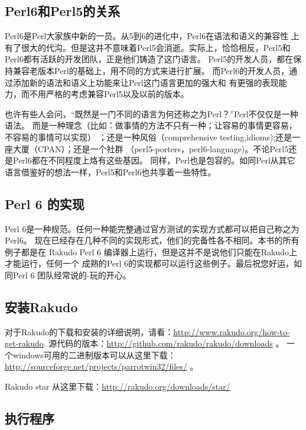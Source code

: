 \documentclass{ctexart}
\begin{document}
\subsection{Perl6和Perl5的关系}
\label{sec-2-3}

Perl6是Perl大家族中新的一员。从5到6的进化中，Perl6在语法和语义的兼容性
上有了很大的代沟。但是这并不意味着Perl5会消逝。实际上，恰恰相反，Perl5和
Perl6都有活跃的开发团队，正是他们铸造了这门语言。
Perl5的开发人员，都在保持兼容老版本Perl的基础上，用不同的方式来进行扩展。
而Perl6的开发人员，通过添加新的语法和语义上功能来让Perl这门语言更加的强大和
有更强的表现能力，而不用严格的考虑兼容Perl5以及以前的版本。

也许有些人会问，“既然是一门不同的语言为何还称之为Perl？”Perl不仅仅是一种语法。
而是一种理念（比如：做事情的方法不只有一种；让容易的事情更容易，不容易的事情可以实现）
；还是一种风俗（comprehensive testing,idioms);还是一座大厦（CPAN）；还是一个社群
（perl5-porters，perl6-language)。不论Perl5还是Perl6都在不同程度上烙有这些基因。
同样，Perl也是包容的。如同Perl从其它语言借鉴好的想法一样，Perl5和Perl6也共享着一些特性。
\subsection{Perl 6 的实现}
\label{sec-2-4}

Perl 6是一种规范。任何一种能完整通过官方测试的实现方式都可以把自己称之为Perl6。
现在已经存在几种不同的实现形式，他们的完备性各不相同。本书的所有例子都是在
Rakudo Perl 6 编译器上运行，但是这并不是说他们只能在Rakudo上才能运行，任何一个
成熟的Perl 6的实现都可以运行这些例子。最后祝您好运，如同Perl 6 团队经常说的-玩的开心。
\subsection{安装Rakudo}
\label{sec-2-5}

对于Rakudo的下载和安装的详细说明，请看：\href{http://www.rakudo.org/how-to-get-rakudo}{http://www.rakudo.org/how-to-get-rakudo}.
源代码的版本：\href{http://github.com/rakudo/rakudo/downloads}{http://github.com/rakudo/rakudo/downloads} 。
一个windows可用的二进制版本可以从这里下载：\href{http://sourceforge.net/projects/parrotwin32/files/}{http://sourceforge.net/projects/parrotwin32/files/} 。

Rakudo star 从这里下载：\href{http://rakudo.org/downloads/star/}{http://rakudo.org/downloads/star/}
\subsection{执行程序}
\label{sec-2-6}
\end{document}
